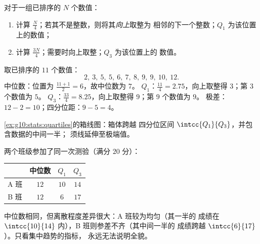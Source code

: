 \begin{method}[求四分位数]\label{met:g10:stats:quartiles}
对于一组已排序的 $N$ 个数值：
\begin{enumerate}
  \item 计算 $\frac N4$；若其不是整数，则将其\emph{向上}取整为
        相邻的下一个整数；$Q_1$ 为该位置上的数值；
  \item 计算 $\frac{3N}{4}$；需要时向上取整；$Q_3$ 为该位置上的
        数值。
\end{enumerate}
\end{method}

\begin{example}\label{ex:g10:stats:quartiles}
取已排序的 $11$ 个数值：
\[
2,\ 3,\ 5,\ 5,\ 6,\ 7,\ 8,\ 9,\ 9,\ 10,\ 12 .
\]
中位数：位置为 $\frac{11+1}{2} = 6$，故中位数为 $7$。
$Q_1$：$\frac{11}{4} = 2.75$，向上取整得 $3$；第 $3$ 个数值为 $5$。
$Q_3$：$\frac{33}{4} = 8.25$，向上取整得 $9$；第 $9$ 个数值为 $9$。
极差：$12 - 2 = 10$；四分位距：$9 - 5 = 4$。
\end{example}

\begin{omfigure}

{\small \cref{ex:g10:stats:quartiles}的箱线图：箱体跨越
四分位区间 $\intcc{Q_1}{Q_3}$，并包含数据的中间一半；
须线延伸至极端值。}
\end{omfigure}

\begin{example}[比较两组]\label{ex:g10:stats:comparison}
两个班级参加了同一次测验（满分 $20$ 分）：
\begin{center}
\renewcommand{\arraystretch}{1.2}
\begin{tabular}{c|ccc}
 & 中位数 & $Q_1$ & $Q_3$ \\
\hline
A 班 & $12$ & $10$ & $14$ \\
B 班 & $12$ & $6$ & $17$ \\
\end{tabular}
\end{center}
中位数相同，但离散程度差异很大：A 班较为均匀（其一半的
成绩在 $\intcc{10}{14}$ 内），B 班则参差不齐（其中间一半的
成绩跨越 $\intcc{6}{17}$）。只看集中趋势的指标，
永远无法说明全貌。
\end{example}

